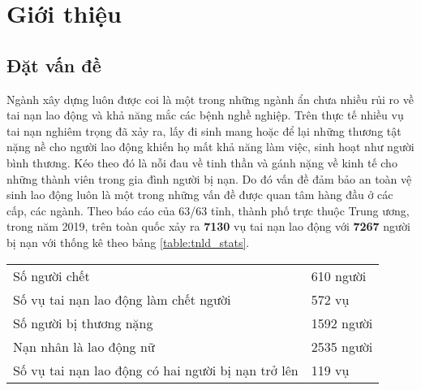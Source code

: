 \chapter{Giới thiệu}
\setcounter{page}{1}
\section{Đặt vấn đề}
Ngành xây dựng luôn được coi là một trong những ngành ẩn chưa nhiều rủi ro về tai nạn lao động và khả năng mắc các bệnh nghề nghiệp. Trên thực tế nhiều vụ tai nạn nghiêm trọng đã xảy ra, lấy đi sinh mang hoặc để lại những thương tật nặng nề cho người lao động khiến họ mất khả năng làm việc, sinh hoạt như người bình thương. Kéo theo đó là nỗi đau về tinh thần và gánh nặng về kinh tế cho những thành viên trong gia đình người bị nạn. Do đó vấn đề đảm bảo an toàn vệ sinh lao động luôn là một trong những vấn đề được quan tâm hàng đầu ở các cấp, các ngành. Theo báo cáo của 63/63 tỉnh, thành phố trực thuộc Trung ương\cite{tnld:2019:gov}, trong năm 2019, trên toàn quốc xảy ra \textbf{7130} vụ tai nạn lao động với \textbf{7267} người bị nạn với thống kê theo bảng \ref{table:tnld_stats}.
\begin{center}

  \begin{tabular} {l l}
  \toprule
  \midrule

  Số người chết & 610 người\\
  Số vụ tai nạn lao động làm chết người & 572 vụ\\
  Số người bị thương nặng & 1592 người \\
  Nạn nhân là lao động nữ & 2535 người \\
  Số vụ tai nạn lao động có hai người bị nạn trở lên & 119 vụ \\
          
  \bottomrule
  \end{tabular}

\end{center}

